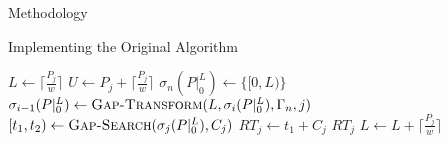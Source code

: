 \documentclass{article}
\begin{document}
\begin{section}{Methodology}
  \begin{subsection}{Implementing the Original Algorithm}
    \begin{algorithm}[H]
      \caption{Gap-Enumeration Algorithm}\label{gapenum1}
      \begin{algorithmic}[1]
          \State $L \gets \lceil\frac{P_{j}}{w}\rceil$
          \State $U \gets P_{j} + \lceil\frac{P_{j}}{w}\rceil$
            \State $\sigma_{n}(P|_{0}^{L}) \gets \{[0,L)\}$
              \State $\sigma_{i-1}(P|_{0}^{L}) \gets \Call{Gap-Transform}{L, \sigma_{i}(P|_{0}^{L}), \Gamma_{n}, j}$
                \State {}
              \EndIf
            \EndFor
            \State $[t_{1},t_{2}) \gets \Call{Gap-Search}{\sigma_{j}(P|_{0}^{L}), C_{j}}$
              \State $RT_{j} \gets t_{1} + C_{j}$
            \EndIf
              \State \Return $RT_{j}$
            \EndIf
            \State $L \gets L + \lceil\frac{P_{j}}{w}\rceil$
          \EndWhile
        \State {}
      \EndFunction
      \end{algorithmic}
    \end{algorithm}


\end{subsection}
\end{section}
\end{document}
